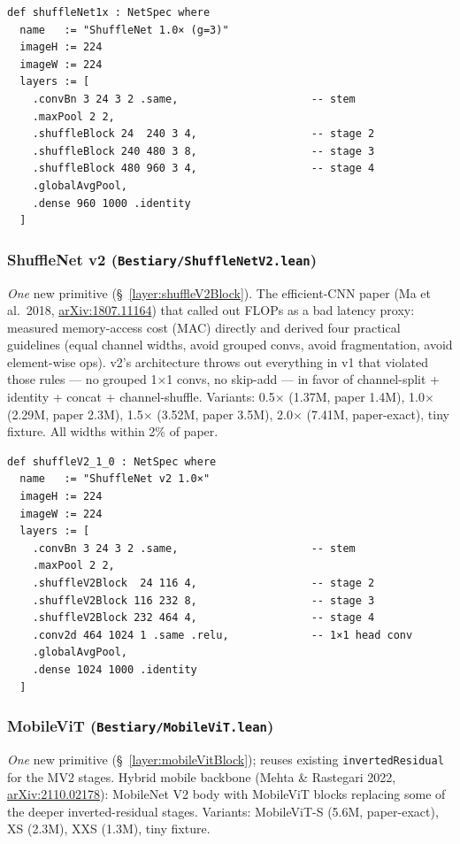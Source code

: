 \begin{verbatim}
def shuffleNet1x : NetSpec where
  name   := "ShuffleNet 1.0× (g=3)"
  imageH := 224
  imageW := 224
  layers := [
    .convBn 3 24 3 2 .same,                     -- stem
    .maxPool 2 2,
    .shuffleBlock 24  240 3 4,                  -- stage 2
    .shuffleBlock 240 480 3 8,                  -- stage 3
    .shuffleBlock 480 960 3 4,                  -- stage 4
    .globalAvgPool,
    .dense 960 1000 .identity
  ]
\end{verbatim}

\subsubsection*{ShuffleNet v2 (\texttt{Bestiary/ShuffleNetV2.lean})}
\emph{One} new primitive (\S~\ref{layer:shuffleV2Block}). The
efficient-CNN paper (Ma et al.\ 2018,
\href{https://arxiv.org/abs/1807.11164}{arXiv:1807.11164}) that called
out FLOPs as a bad latency proxy: measured memory-access cost
(MAC) directly and derived four practical guidelines (equal channel
widths, avoid grouped convs, avoid fragmentation, avoid element-wise
ops). v2's architecture throws out everything in v1 that violated
those rules --- no grouped 1$\times$1 convs, no skip-add --- in
favor of channel-split + identity + concat + channel-shuffle.
Variants: 0.5$\times$ (1.37M, paper 1.4M), 1.0$\times$ (2.29M, paper
2.3M), 1.5$\times$ (3.52M, paper 3.5M), 2.0$\times$ (7.41M,
paper-exact), tiny fixture. All widths within 2\% of paper.

\begin{verbatim}
def shuffleV2_1_0 : NetSpec where
  name   := "ShuffleNet v2 1.0×"
  imageH := 224
  imageW := 224
  layers := [
    .convBn 3 24 3 2 .same,                     -- stem
    .maxPool 2 2,
    .shuffleV2Block  24 116 4,                  -- stage 2
    .shuffleV2Block 116 232 8,                  -- stage 3
    .shuffleV2Block 232 464 4,                  -- stage 4
    .conv2d 464 1024 1 .same .relu,             -- 1×1 head conv
    .globalAvgPool,
    .dense 1024 1000 .identity
  ]
\end{verbatim}

\subsubsection*{MobileViT (\texttt{Bestiary/MobileViT.lean})}
\emph{One} new primitive (\S~\ref{layer:mobileVitBlock}); reuses existing
\texttt{invertedResidual} for the MV2 stages. Hybrid mobile backbone
(Mehta \& Rastegari 2022,
\href{https://arxiv.org/abs/2110.02178}{arXiv:2110.02178}):
MobileNet V2 body with MobileViT blocks replacing some of the deeper
inverted-residual stages. Variants: MobileViT-S (5.6M, paper-exact),
XS (2.3M), XXS (1.3M), tiny fixture.

